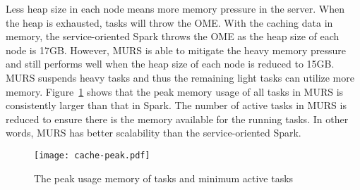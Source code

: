 Less heap size in each node means more memory pressure in the server. When the heap is exhausted, tasks will throw the OME. With the caching data in memory, the service-oriented Spark throws the OME as the heap size of each node is 17GB. However, MURS is able to mitigate the heavy memory pressure and still performs well when the heap size of each node is reduced to 15GB. MURS suspends heavy tasks and  thus the remaining light tasks can utilize more memory. Figure~\ref{fig:cache-peak} shows that the peak memory usage of all tasks in MURS is consistently larger than that in Spark. The number of active tasks in MURS is reduced to ensure there is the memory available for the running tasks. In other words, MURS has better scalability than the service-oriented Spark.

\begin{figure}[!t]
\centering
\texttt{[image: cache-peak.pdf]}
\vspace{-2mm}
\caption{The peak usage memory of tasks and minimum active tasks}
\vspace{-4mm}
\label{fig:cache-peak}
\end{figure}


\begin{comment}
\textbf{Potential Starvation} The mitigation strategy of memory pressure delays the computation of suspended tasks. This may cause the starvation of the suspended tasks. MURS address this issue in the application level. 
When PR and AQ are submitted to the server, t
he execution time of each application is shown in Figure~\ref{fig:cache-prwc}. The result shows there is no starvation for PR. Benefiting from MURS, the performance of PR is improved by up to 24.4\%. The performance of AQ, which contains light tasks, also achieves a 29.8\% improvement. 

\begin{figure}[!t]
\centering
\texttt{[image: cache-prwc.pdf]}
\vspace{-2mm}
\caption{The execution time of each application}
\vspace{-2mm}
\label{fig:cache-prwc}
\end{figure}

MURS applies the FIFO algorithm when it resumes the suspended tasks. This avoids the long wait of these tasks. Otherwise, suspending these tasks is going to mitigate the memory pressure not only for the currently running light tasks, but also the heavy tasks running next. In the application level, the transient suspension and light memory pressure are actually the trade-off made by MURS. 
\end{comment}

